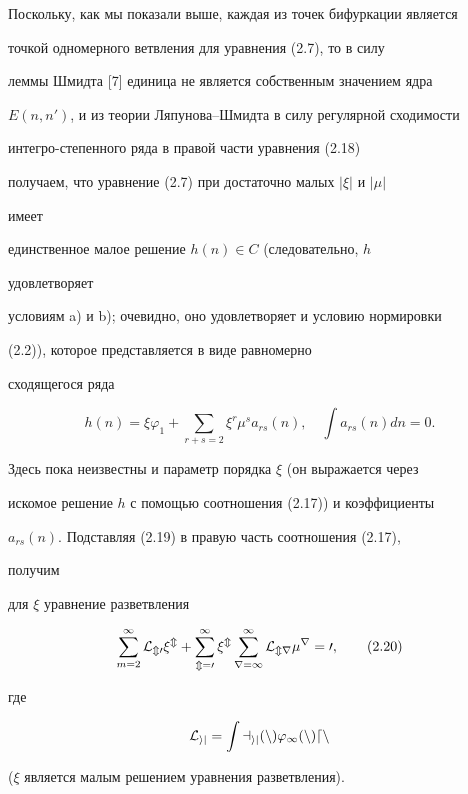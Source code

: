 Поскольку, как мы показали выше, каждая из точек бифуркации является 


точкой одномерного ветвления для уравнения (2.7), то в силу 


леммы Шмидта [7] единица не является собственным значением ядра 


$E(n,n')$, и из теории Ляпунова--Шмидта в силу регулярной сходимости 


интегро-степенного ряда в правой части уравнения (2.18)  


получаем, что уравнение (2.7) при достаточно малых $|\xi|$ и $|\mu|$ 


имеет 


единственное малое решение $h(n)\in C$ (следовательно, $h$ 


удовлетворяет 


условиям a) и b); очевидно, оно удовлетворяет и условию нормировки 


(2.2)), которое представляется в виде равномерно  


сходящегося ряда 


\begin{equation} 


h(n)=\xi\varphi_1+\sum_{r+s=2}\xi^r\mu^s a_{rs}(n),\quad 


\int a_{rs}(n)dn=0.\tag{2.19} 


\end{equation} 


Здесь пока неизвестны и параметр порядка $\xi$ (он выражается через 


искомое решение $h$ с помощью соотношения (2.17)) и коэффициенты 


$a_{rs}(n)$. Подставляя (2.19) в правую часть соотношения (2.17), 


получим 


для $\xi$ уравнение разветвления  


\begin{equation} 


\sum^\infty_{m=2}\cal L_{m0}\xi^m+ 


\sum^\infty_{m=0}\xi^m\sum^\infty_{r=1}\cal L_{mr}\mu^r=0,\tag{2.20} 


\end{equation} 


где 


$$ 


\cal L_{ij}=\int a_{ij}(n)\varphi_1(n)dn 


$$ 


($\xi$ является малым решением уравнения разветвления). 


